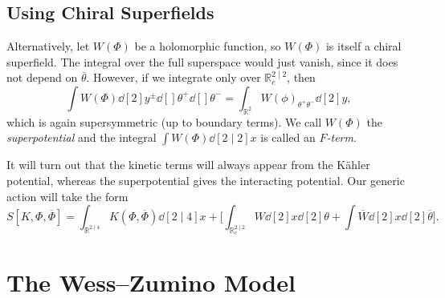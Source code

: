 \subsection{Using Chiral Superfields}%
\label{sub:using_chiral_superfields}

Alternatively, let $W(\Phi)$ be a holomorphic function, so $W(\Phi)$ is itself a chiral superfield.
The integral over the full superspace would just vanish, since it does not depend on $\overline{\theta}{}$.
However, if we integrate only over $\mathbb{R}^{2 \mid 2}_c$, then
\begin{equation}
  \int W (\Phi) \dd[2]{y^{\pm}} \dd[]{\theta^+} \dd[]{\theta^-} = \int_{\mathbb{R}^2} W(\phi)_{\theta^+ \theta^-} \dd[2]{y},
\end{equation}
which is again supersymmetric (up to boundary terms).
We call $W(\Phi)$ the \emph{superpotential} and the integral $\int W(\Phi) \dd[2 \mid 2]{x}$ is called an \emph{$F$-term}.

It will turn out that the kinetic terms will always appear from the Kähler potential, whereas the superpotential gives the interacting potential.
Our generic action will take the form
\begin{equation}
  S[K, \Phi, \overline{\Phi}{}] = \int_{\mathbb{R}^{2 \mid 4}} K (\Phi, \overline{\Phi}{}) \dd[2 \mid 4]{x} 
  + \biggl[\int_{\mathbb{R}^{2 \mid 2}_c} W \dd[2]{x} \dd[2]{\theta} + \int \overline{W}{} \dd[2]{x} \dd[2]{\overline{\theta}}\biggr].
\end{equation}

\section{The Wess--Zumino Model}%
\label{sec:the_wess_zumino_model}


